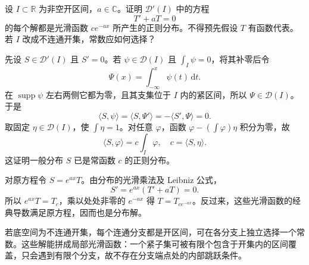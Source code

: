 \begin{optionalexercise}\label{b1:ex:20-distribution-first-order-ode}
设 \(I\subset\mathbb R\) 为非空开区间，\(a\in\mathbb C\)。证明 \(\mathcal D'(I)\) 中的方程
\[
 T'+aT=0
\]
的每个解都是光滑函数 \(ce^{-ax}\) 所产生的正则分布。不得预先假设 \(T\) 有函数代表。若 \(I\) 改成不连通开集，常数应如何选择？
\end{optionalexercise}
\begin{solution}
先设 \(S\in\mathcal D'(I)\) 且 \(S'=0\)。若 \(\psi\in\mathcal D(I)\) 且 \(\int_I\psi=0\)，将其补零后令
\[
 \Psi(x)=\int_{-\infty}^x\psi(t)\,\mathrm dt.
\]
在 \(\operatorname{supp}\psi\) 左右两侧它都为零，且其支集位于 \(I\) 内的紧区间，所以 \(\Psi\in\mathcal D(I)\)。于是
\[
 \langle S,\psi\rangle=\langle S,\Psi'\rangle=-\langle S',\Psi\rangle=0.
\]
取固定 \(\eta\in\mathcal D(I)\)，使 \(\int\eta=1\)。对任意 \(\varphi\)，函数 \(\varphi-(\int\varphi)\eta\) 积分为零，故
\[
 \langle S,\varphi\rangle=c\int_I\varphi,
 \quad c=\langle S,\eta\rangle.
\]
这证明一般分布 \(S\) 已是常函数 \(c\) 的正则分布。

对原方程令 \(S=e^{ax}T\)。由分布的光滑乘法及 Leibniz 公式，
\[
 S'=e^{ax}(T'+aT)=0.
\]
所以 \(e^{ax}T=T_c\)，乘以处处非零的 \(e^{-ax}\) 得 \(T=T_{ce^{-ax}}\)。反过来，这些光滑函数的经典导数满足原方程，因而也是分布解。

若底空间为不连通开集，每个连通分支都是开区间，可在各分支上独立选择一个常数。这些解能拼成局部光滑函数：一个紧子集可被有限个包含于开集内的区间覆盖，只会遇到有限个分支，故不存在分支端点处的内部跳跃条件。
\end{solution}

